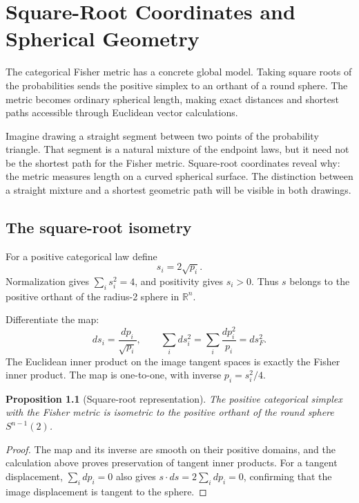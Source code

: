 \documentclass[11pt,oneside,openany]{book}
\newtheorem{proposition}[theorem]{Proposition}
\theoremstyle{definition}
\theoremstyle{remark}
\newcommand{\R}{\mathbb{R}}
\numberwithin{equation}{chapter}
\begin{document}
\mainmatter
\setcounter{chapter}{7}
\chapter{Square-Root Coordinates and Spherical Geometry}
\label{ch:sphere}

The categorical Fisher metric has a concrete global model. Taking square roots of the probabilities sends the positive simplex to an orthant of a round sphere. The metric becomes ordinary spherical length, making exact distances and shortest paths accessible through Euclidean vector calculations.

Imagine drawing a straight segment between two points of the probability triangle. That segment is a natural mixture of the endpoint laws, but it need not be the shortest path for the Fisher metric. Square-root coordinates reveal why: the metric measures length on a curved spherical surface. The distinction between a straight mixture and a shortest geometric path will be visible in both drawings.

\section{The square-root isometry}
For a positive categorical law define
\begin{equation}\label{eq:sqrtmap}
s_i=2\sqrt{p_i}.
\end{equation}
Normalization gives $\sum_i s_i^2=4$, and positivity gives $s_i>0$. Thus $s$ belongs to the positive orthant of the radius-2 sphere in $\R^n$.

Differentiate the map:
\[
ds_i=\frac{dp_i}{\sqrt{p_i}},\qquad
\sum_i ds_i^2=\sum_i\frac{dp_i^2}{p_i}=ds_F^2.
\]
The Euclidean inner product on the image tangent spaces is exactly the Fisher inner product. The map is one-to-one, with inverse $p_i=s_i^2/4$.

\begin{proposition}[Square-root representation]
The positive categorical simplex with the Fisher metric is isometric to the positive orthant of the round sphere $S^{n-1}(2)$.
\end{proposition}
\begin{proof}
The map and its inverse are smooth on their positive domains, and the calculation above proves preservation of tangent inner products. For a tangent displacement, $\sum_i dp_i=0$ also gives $s\cdot ds=2\sum_i dp_i=0$, confirming that the image displacement is tangent to the sphere.
\end{proof}
\end{document}
